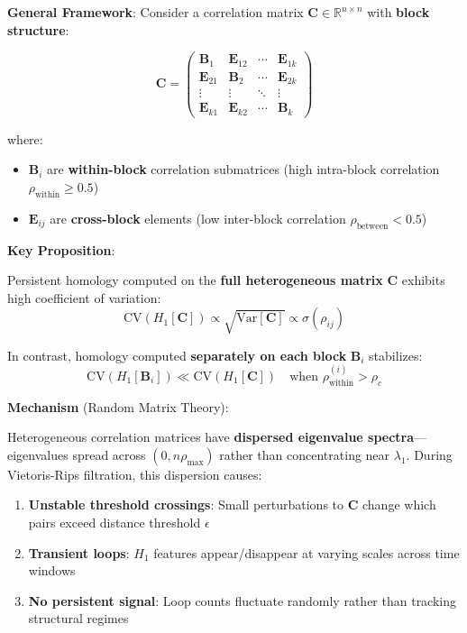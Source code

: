 \textbf{General Framework}: Consider a correlation matrix $\mathbf{C} \in \mathbb{R}^{n \times n}$ with \textbf{block structure}:

\begin{equation}
\mathbf{C} =
\begin{pmatrix}
\mathbf{B}_1 & \mathbf{E}_{12} & \cdots & \mathbf{E}_{1k} \\
\mathbf{E}_{21} & \mathbf{B}_2 & \cdots & \mathbf{E}_{2k} \\
\vdots & \vdots & \ddots & \vdots \\
\mathbf{E}_{k1} & \mathbf{E}_{k2} & \cdots & \mathbf{B}_k
\end{pmatrix}
\end{equation}

where:
\begin{itemize}
\item $\mathbf{B}_i$ are \textbf{within-block} correlation submatrices (high intra-block correlation $\rho_{\text{within}} \geq 0.5$)
\item $\mathbf{E}_{ij}$ are \textbf{cross-block} elements (low inter-block correlation $\rho_{\text{between}} < 0.5$)
\end{itemize}

\textbf{Key Proposition}:

Persistent homology computed on the \textbf{full heterogeneous matrix} $\mathbf{C}$ exhibits high coefficient of variation:
\begin{equation}
\text{CV}(H_1[\mathbf{C}]) \propto \sqrt{\text{Var}[\mathbf{C}]} \propto \sigma(\rho_{ij})
\end{equation}

In contrast, homology computed \textbf{separately on each block} $\mathbf{B}_i$ stabilizes:
\begin{equation}
\text{CV}(H_1[\mathbf{B}_i]) \ll \text{CV}(H_1[\mathbf{C}]) \quad \text{when } \rho_{\text{within}}^{(i)} > \rho_c
\end{equation}

\textbf{Mechanism} (Random Matrix Theory):

Heterogeneous correlation matrices have \textbf{dispersed eigenvalue spectra}---eigenvalues spread across $(0, n\rho_{\max})$ rather than concentrating near $\lambda_1$. During Vietoris-Rips filtration, this dispersion causes:
\begin{enumerate}
\item \textbf{Unstable threshold crossings}: Small perturbations to $\mathbf{C}$ change which pairs exceed distance threshold $\epsilon$
\item \textbf{Transient loops}: $H_1$ features appear/disappear at varying scales across time windows
\item \textbf{No persistent signal}: Loop counts fluctuate randomly rather than tracking structural regimes
\end{enumerate}


